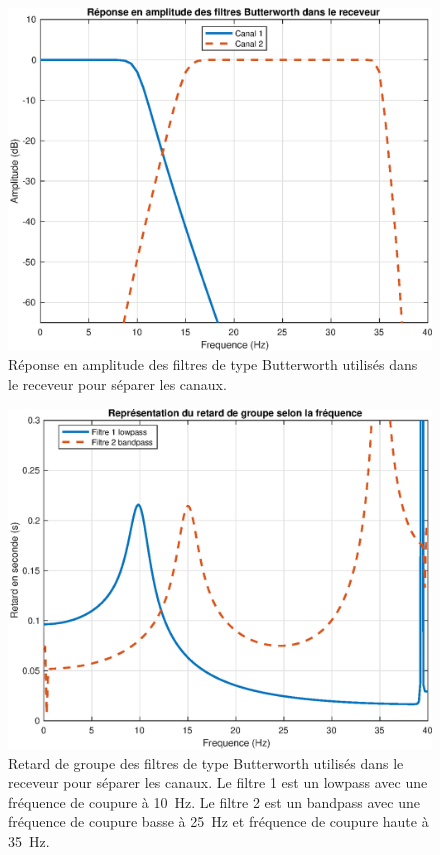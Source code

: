 \documentclass[10pt, oneside, a4paper]{article}
\begin{document}
\begin{figure}[p]
    \centering
    \includegraphics[height=0.4\textheight]{eps/filters.eps}
    \caption{Réponse en amplitude des filtres de type Butterworth utilisés dans le receveur
             pour séparer les canaux.}
    \label{fig:filters}
\end{figure}

\begin{figure}[p]
    \centering
    \includegraphics[height=0.45\textheight]{eps/grpdelay.eps}
    \caption{Retard de groupe des filtres de type Butterworth utilisés dans le receveur
             pour séparer les canaux.
             Le filtre 1 est un lowpass avec une fréquence de coupure à \SI{10}{\hertz}.
             Le filtre 2 est un bandpass avec une fréquence de coupure basse à
             \SI{25}{\hertz} et fréquence de coupure haute à \SI{35}{\hertz}.}
    \label{fig:grpdelay}
\end{figure}
\end{document}
